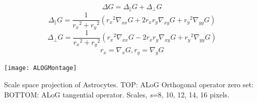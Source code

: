 \documentclass[portrait,final,a0paper]{baposter}
\begin{document}
\begin{poster}
{\begin{minipage}{.5\textwidth}
	\color{Carnelian}
	\begin{equation*}
	\label{eq:scale}
	\Delta G= \Delta_\parallel G + \Delta_\perp G
	\end{equation*}
	\begin{equation*}
	\label{eq:scale}
	\Delta_\parallel G=  \frac{1}{{r_x}^{2}+{r_y}^{2}} \left({r_x}^{2} \nabla_{xx} G + 2 {r_x} {r_y}\nabla_{xy} G + {r_y}^{2} \nabla_{yy} G \right)
	\end{equation*}
	\begin{equation*}
	\label{eq:scale}
	\Delta_\perp G=  \frac{1}{{r_x}^{2}+{r_y}^{2}} \left({r_x}^{2} \nabla_{xx} G - 2 {r_x} {r_y}\nabla_{xy} G + {r_y}^{2} \nabla_{yy} G \right)
	\end{equation*}
	\begin{equation*}
	{r_x}= \nabla_{x} G , {r_y}= \nabla_{y} G
	\end{equation*}	
\end{minipage}
\begin{minipage}{.64\textwidth}
	\texttt{[image: ALOGMontage]} 
	 \vspace{0.4cm}
\end{minipage}
  
 \color{DarkMagenta} Scale space projection of Astrocytes. TOP: ALoG Orthogonal operator zero set: BOTTOM: ALoG tangential operator. Scales, \textit{s}=8, 10, 12, 14, 16 pixels.
  
}  

\end{poster}
\end{document}
